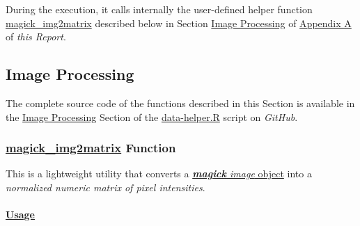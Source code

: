 \documentclass[
]{report}
\begin{document}
\begin{noteblock}
During the execution, it calls internally the user-defined helper function \hyperref[func.magick_img2matrix]{magick\_img2matrix} described below in Section \hyperref[appndx_a.img_proc]{Image Processing} of \hyperref[appndx_a]{Appendix A} of \emph{this Report}.

\end{noteblock}

\newpage

\subsection{Image Processing}\label{appndx_a.data_helper.img_proc}

\begin{noteblock}
The complete source code of the functions described in this Section is available in the \href{https://github.com/AzKurban-edX-DS/edx.capstone.choose-your-own/tree/main/r/support-functions/data-helper.R\#L420-L488}{Image Processing} Section of the \href{https://github.com/AzKurban-edX-DS/edx.capstone.choose-your-own/tree/main/r/support-functions/data-helper.R\#L420-L488}{data-helper.R} script on \emph{GitHub}.

\end{noteblock}

\subsubsection{\texorpdfstring{\href{https://github.com/AzKurban-edX-DS/edx.capstone.choose-your-own/blob/main/r/support-functions/data-helper.R\#L485}{magick\_img2matrix} Function}{magick\_img2matrix Function}}\label{func.magick_img2matrix}

\hfill\break

This is a lightweight utility that converts a \href{https://docs.ropensci.org/magick/reference/editing.html\#details}{\emph{\textbf{magick} image} object} into a \emph{normalized numeric matrix of pixel intensities}.

\protect{}\label{func.magick_img2matrix.usage}
\paragraph{\texorpdfstring{\href{https://github.com/AzKurban-edX-DS/edx.capstone.choose-your-own/blob/main/r/support-functions/data-helper.R\#L}{Usage}}{Usage}}\label{usage-4}

\hfill\break
\end{document}
